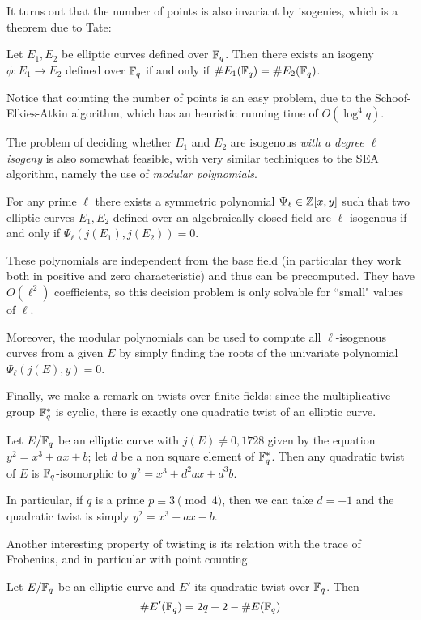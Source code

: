 It turns out that the number of points is also invariant by isogenies, which is a theorem due to Tate:
\begin{theorem}
    Let $E_1,E_2$ be elliptic curves defined over $\mathbb{F}_q$. Then there exists an isogeny $\phi: E_1\to E_2$ defined over $\mathbb{F}_q$ if and only if $\# E_1(\mathbb{F}_q)=\# E_2(\mathbb{F}_q)$.
\end{theorem}

Notice that counting the number of points is an easy problem, due to the Schoof-Elkies-Atkin algorithm, which has an heuristic running time of $O(\log^4 q)$.

The problem of deciding whether $E_1$ and $E_2$ are isogenous \emph{with a degree $\ell$ isogeny} is also somewhat feasible, with very similar techiniques to the SEA algorithm, namely the use of \emph{modular polynomials}.

\begin{theorem}
    For any prime $\ell$ there exists a symmetric polynomial $\Psi_\ell\in\mathbb{Z}[x,y]$ such that two elliptic curves $E_1,E_2$ defined over an algebraically closed field are $\ell$-isogenous if and only if $\Psi_\ell(j(E_1),j(E_2))=0$.
\end{theorem}

These polynomials are independent from the base field (in particular they work both in positive and zero characteristic) and thus can be precomputed. They have $O(\ell^2)$ coefficients, so this decision problem is only solvable for ``small" values of $\ell$.

Moreover, the modular polynomials can be used to compute all $\ell$-isogenous curves from a given $E$ by simply finding the roots of the univariate polynomial $\Psi_\ell(j(E),y)=0$.

Finally, we make a remark on twists over finite fields: since the multiplicative group $\mathbb{F}_q^\ast$ is cyclic, there is exactly one quadratic twist of an elliptic curve.
\begin{proposition}
    Let $E/\mathbb{F}_q$ be an elliptic curve with $j(E)\neq0,1728$ given by the equation $y^2=x^3+ax+b$; let $d$ be a non square element of $\mathbb{F}_q^\ast$. Then any quadratic twist of $E$ is $\mathbb{F}_q$-isomorphic to $y^2=x^3+d^2ax+d^3b$.
\end{proposition}
In particular, if $q$ is a prime $p\equiv3\pmod4$, then we can take $d=-1$ and the quadratic twist is simply $y^2=x^3+ax-b$.

Another interesting property of twisting is its relation with the trace of Frobenius, and in particular with point counting.
\begin{proposition}
    Let $E/\mathbb{F}_q$ be an elliptic curve and $E'$ its quadratic twist over $\mathbb{F}_q$. Then $$\# E'(\mathbb{F}_q) = 2q+2 - \# E(\mathbb{F}_q)$$
\end{proposition}

